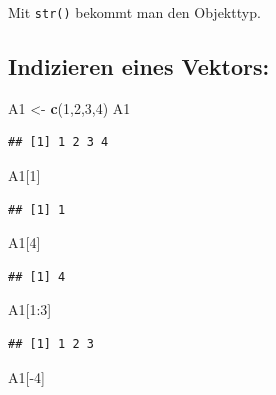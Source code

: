 \documentclass[]{article}
\newenvironment{Shaded}{\begin{snugshade}}{\end{snugshade}}
\newcommand{\KeywordTok}[1]{\textcolor[rgb]{0.13,0.29,0.53}{\textbf{{#1}}}}
\newcommand{\DecValTok}[1]{\textcolor[rgb]{0.00,0.00,0.81}{{#1}}}
\newcommand{\StringTok}[1]{\textcolor[rgb]{0.31,0.60,0.02}{{#1}}}
\newcommand{\NormalTok}[1]{{#1}}
\begin{document}
Mit \texttt{str()} bekommt man den Objekttyp.

\subsection{Indizieren eines Vektors:}\label{indizieren-eines-vektors}

\begin{Shaded}
\begin{Highlighting}[]
\NormalTok{A1 <-}\StringTok{ }\KeywordTok{c}\NormalTok{(}\DecValTok{1}\NormalTok{,}\DecValTok{2}\NormalTok{,}\DecValTok{3}\NormalTok{,}\DecValTok{4}\NormalTok{)}
\NormalTok{A1}
\end{Highlighting}
\end{Shaded}

\begin{verbatim}
## [1] 1 2 3 4
\end{verbatim}

\begin{Shaded}
\begin{Highlighting}[]
\NormalTok{A1[}\DecValTok{1}\NormalTok{]}
\end{Highlighting}
\end{Shaded}

\begin{verbatim}
## [1] 1
\end{verbatim}

\begin{Shaded}
\begin{Highlighting}[]
\NormalTok{A1[}\DecValTok{4}\NormalTok{]}
\end{Highlighting}
\end{Shaded}

\begin{verbatim}
## [1] 4
\end{verbatim}

\begin{Shaded}
\begin{Highlighting}[]
\NormalTok{A1[}\DecValTok{1}\NormalTok{:}\DecValTok{3}\NormalTok{]}
\end{Highlighting}
\end{Shaded}

\begin{verbatim}
## [1] 1 2 3
\end{verbatim}

\begin{Shaded}
\begin{Highlighting}[]
\NormalTok{A1[-}\DecValTok{4}\NormalTok{]}
\end{Highlighting}
\end{Shaded}
\end{document}
